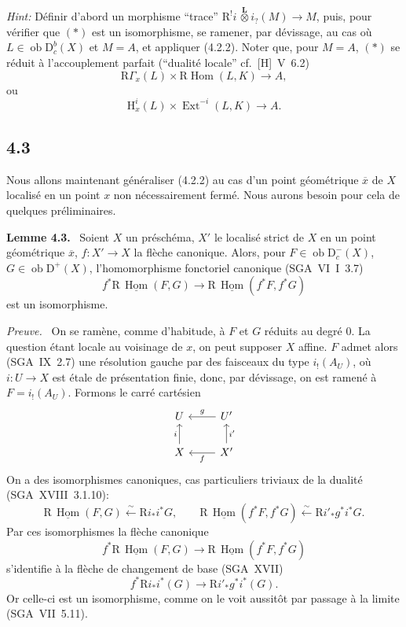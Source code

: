 \documentclass[11pt]{article}
\newenvironment{statement}[1]{\par\medskip\noindent\textbf{#1.}\ }{\par\medskip}
\newenvironment{prooftext}[1][Proof]{\par\noindent\emph{#1.}\ }{\par\medskip}
\renewcommand{\H}{\mathrm{H}}
\DeclareMathOperator{\Hom}{Hom}
\DeclareMathOperator{\Ext}{Ext}
\newcommand{\R}{\mathrm{R}}
\newcommand{\D}{\mathrm{D}}
\newcommand{\ob}{\operatorname{ob}}
\newcommand{\ol}[1]{\overline{#1}}
\providecommand{\Hom}{\operatorname{Hom}}
\providecommand{\ob}{\operatorname{ob}}
\begin{document}
\emph{Hint:} Définir d'abord un morphisme ``trace'' $\R^{!}i\,\overset{\mathbf L}{\otimes}i_?(M)\to M$, puis, pour vérifier que $(*)$ est un isomorphisme, se ramener, par dévissage, au cas où $L\in\ob\D_c^b(X)$ et $M=A$, et appliquer (4.2.2). Noter que, pour $M=A$, $(*)$ se réduit à l'accouplement parfait (``dualité locale'' cf.~[H]~V~6.2)
\[
\R\Gamma_x(L)\times \R\Hom(L,K)\longrightarrow A,
\]
ou
\[
\H_x^i(L)\times \Ext^{-i}(L,K)\longrightarrow A.
\]

\subsection*{4.3}
Nous allons maintenant généraliser (4.2.2) au cas d'un point géométrique $\ol{x}$ de $X$ localisé en un point $x$ non nécessairement fermé. Nous aurons besoin pour cela de quelques préliminaires.

\begin{statement}{Lemme 4.3}
Soient $X$ un préschéma, $X'$ le localisé strict de $X$ en un point géométrique $\ol{x}$, $f:X'\to X$ la flèche canonique. Alors, pour $F\in\ob\D_c^-(X)$, $G\in\ob\D^+(X)$, l'homomorphisme fonctoriel canonique (SGA~VI~I~3.7)
\[
f^*\R\,\underline{\Hom}(F,G)\longrightarrow \R\,\underline{\Hom}(f^*F,f^*G)
\]
est un isomorphisme.
\end{statement}

\begin{prooftext}[Preuve]
On se ramène, comme d'habitude, à $F$ et $G$ réduits au degré $0$. La question étant locale au voisinage de $x$, on peut supposer $X$ affine. $F$ admet alors (SGA~IX~2.7) une résolution gauche par des faisceaux du type $i_!(A_U)$, où $i:U\to X$ est étale de présentation finie, donc, par dévissage, on est ramené à $F=i_!(A_U)$. Formons le carré cartésien
\[
\begin{tikzcd}
U & U' \arrow[l,"g"'] \\
X \arrow[u,"i"] & X' \arrow[l,"f"] \arrow[u,"i'"']
\end{tikzcd}
\]
On a des isomorphismes canoniques, cas particuliers triviaux de la dualité (SGA~XVIII~3.1.10):
\[
\R\,\underline{\Hom}(F,G)\xleftarrow{\sim}\R i_* i^*G,
\qquad
\R\,\underline{\Hom}(f^*F,f^*G)\xleftarrow{\sim}\R i'_* g^*i^*G.
\]
Par ces isomorphismes la flèche canonique
\[
f^*\R\,\underline{\Hom}(F,G)\longrightarrow \R\,\underline{\Hom}(f^*F,f^*G)
\]
s'identifie à la flèche de changement de base (SGA~XVII)
\[
f^*\R i_*i^*(G)\longrightarrow \R i'_*g^*i^*(G).
\]
Or celle-ci est un isomorphisme, comme on le voit aussitôt par passage à la limite (SGA~VII~5.11).
\end{prooftext}
\end{document}
